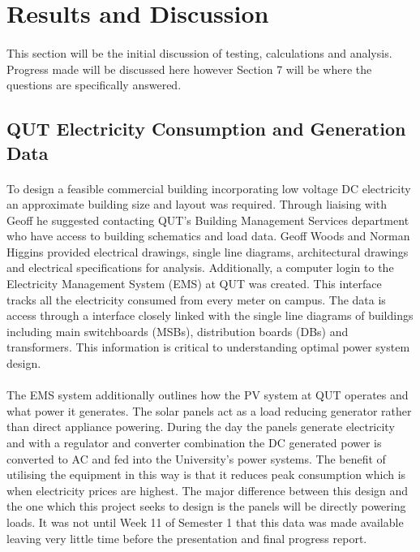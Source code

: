 \section{Results and Discussion}

\paragraph{}
This section will be the initial discussion of testing, calculations and analysis. Progress made will be discussed here however Section 7 will be where the questions are specifically answered. 

\subsection{QUT Electricity Consumption and Generation Data}

\paragraph{}
To design a feasible commercial building incorporating low voltage DC electricity an approximate building size and layout was required. Through liaising with Geoff he suggested contacting QUT's Building Management Services department who have access to building schematics and load data. Geoff Woods and Norman Higgins provided electrical drawings, single line diagrams, architectural drawings and electrical specifications for analysis. Additionally, a computer login to the Electricity Management System (EMS) at QUT was created. This interface tracks all the electricity consumed from every meter on campus. The data is access through a interface closely linked with the single line diagrams of buildings including main switchboards (MSBs), distribution boards (DBs) and transformers. This information is critical to understanding optimal power system design.  

\paragraph{}
The EMS system additionally outlines how the PV system at QUT operates and what power it generates. The solar panels act as a load reducing generator rather than direct appliance powering. During the day the panels generate electricity and with a regulator and converter combination the DC generated power is converted to AC and fed into the University's power systems. The benefit of utilising the equipment in this way is that it reduces peak consumption which is when electricity prices are highest. The major difference between this design and the one which this project seeks to design is the panels will be directly powering loads. It was not until Week 11 of Semester 1 that this data was made available leaving very little time before the presentation and final progress report.

